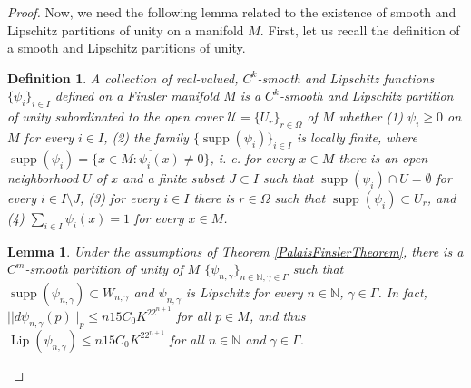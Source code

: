 \documentclass[11pt]{amsart}
\newtheorem{lem}[thm]{Lemma}
\newtheorem{defn}[thm]{Definition}
\numberwithin{equation}{section}
\begin{document}
\begin{proof}
Now, we need the following lemma related to the existence of smooth and Lipschitz  partitions of unity on a manifold $M$.
First, let us recall  the definition of a smooth and Lipschitz partitions of unity.

\begin{defn} A collection of real-valued, $C^k$-smooth and Lipschitz functions $\{\psi_i\}_{i\in I}$  defined on a Finsler manifold $M$ is a $C^k$-smooth and Lipschitz partition of unity  subordinated to the open cover $\mathcal{U}=\{U_r\}_{r\in \Omega}$ of $M$ whether
 (1)   $\psi_i\ge 0$ on $M$ for every $i\in I$, (2) the family $\{{\operatorname{supp}} (\psi_i)\}_{i\in I}$ is locally finite, where ${\operatorname{supp}} (\psi_i) =
 \overline{\{x\in M: \psi_i(x)\neq 0\}}$, i. e. for every $x\in M$ there is an open neighborhood $U$ of $x$ and a finite subset $J\subset I$ such that
 ${\operatorname{supp}} (\psi_i)\cap U=\emptyset$ for every  $i\in I\setminus J$,
 (3) for
 every $i\in I$ there is $r\in \Omega$ such that ${\operatorname{supp}} (\psi_i)\subset  U_{r}$, and (4) $\sum_{i\in I} \psi_i(x)=1$ for every
 $x\in M$.
\end{defn}

\begin{lem}\label{partition1}
Under the assumptions of Theorem \ref{PalaisFinslerTheorem}, there is a $C^m$-smooth partition of unity of $M$  $\{\psi_{n,\gamma}\}_{n\in\mathbb{N}, \gamma\in\Gamma}$
such that ${\operatorname{supp}}(\psi_{n,\gamma}) \subset W_{n,\gamma}$
and $\psi_{n,\gamma}$ is Lipschitz for every
$n\in \mathbb N$, $\gamma \in \Gamma$. In fact,   $||d\psi_{n,\gamma}(p)||_p
\le n15 C_0K^22^{n+1}$ for all $p\in M$, and thus ${\operatorname{Lip}}(\psi_{n,\gamma})\le  n15 C_0K^22^{n+1}$ for all  $n\in \mathbb N$ and
$\gamma \in \Gamma$.
\end{lem}


\end{proof}
\end{document}
